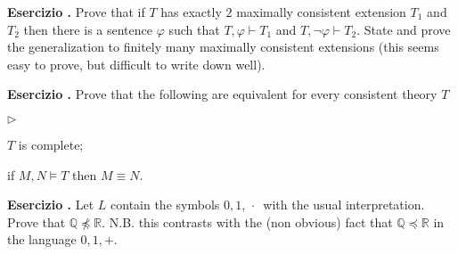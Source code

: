 \documentclass[10pt]{article}
\def\phi{\varphi}
\def\proves{\vdash}
\def\QQ{\mathds Q}
\def\RR{\mathds R}
\newcommand{\labella}[1]{{\sf\footnotesize #1}\hfill}
\renewenvironment{itemize}
  {\begin{list}{$\triangleright$}{%
   \setlength{\parskip}{0mm}
   \setlength{\topsep}{0mm}
   \setlength{\rightmargin}{0mm}
   \setlength{\listparindent}{0mm}
   \setlength{\itemindent}{0mm}
   \setlength{\labelwidth}{3ex}
   \setlength{\itemsep}{0mm}
   \setlength{\parsep}{0mm}
   \setlength{\partopsep}{0mm}
   \setlength{\labelsep}{1ex}
   \setlength{\leftmargin}{\labelwidth+\labelsep}
   \let\makelabel\labella}}{%
   \end{list}}
\newcounter{ex}
\newenvironment{exercise}{\bigskip\addtocounter{ex}{1}\textbf{Esercizio \theex.\quad}}{}
\begin{document}
\clearpage%
\setcounter{ex}{0}

\begin{exercise}
  Prove that if $T$ has exactly $2$ maximally consistent extension $T_1$ and $T_2$ then there is a sentence $\phi$ such that $T,\phi\proves T_1$ and $T,\neg\phi\proves T_2$.
  State and prove the generalization to finitely many maximally consistent extensions (this seems easy to prove, but difficult to write down well).
\end{exercise}

\begin{exercise}
  Prove that the following are equivalent for every consistent theory $T$
  \begin{itemize}
    \item[1.] $T$ is complete;
    \item[2.] if $M,N\models T$ then $M\equiv N$.
  \end{itemize} 
\end{exercise} 

\begin{exercise}
  Let $L$ contain the symbols $0,1,\,\cdot\,$ with the usual interpretation. Prove that $\QQ\not\preceq\RR$. N.B. this contrasts with the (non obvious) fact that $\QQ\preceq\RR$ in the language $0,1,+$.
\end{exercise}
\end{document}
